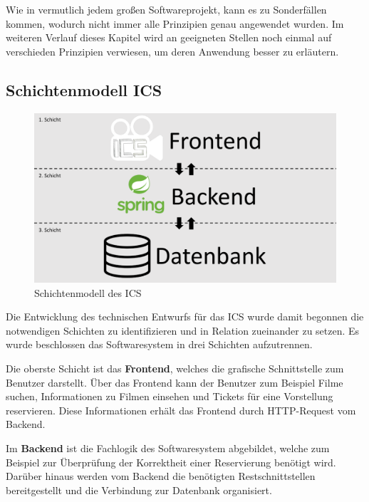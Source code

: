 		Wie in vermutlich jedem großen Softwareprojekt, kann es zu Sonderfällen kommen, wodurch nicht immer alle Prinzipien genau angewendet wurden. Im weiteren Verlauf dieses Kapitel wird an geeigneten Stellen noch einmal auf verschieden Prinzipien verwiesen, um deren Anwendung besser zu erläutern.
		
		\subsection{Schichtenmodell ICS} \label{schichtenmodell}
		
		
		\begin{figure}[H]
			\centering 
			\includegraphics[width=12cm]{img/Schichtenmodell_ICS.pdf}
			\captionsetup{format=hang}
			\caption[Klassendiagramm]{\label{fig:Schichtenmodell} Schichtenmodell des ICS }
		\end{figure}
		
		Die Entwicklung des technischen Entwurfs für das \ac{ICS} wurde damit begonnen die notwendigen Schichten zu identifizieren und in Relation zueinander zu setzen. Es wurde beschlossen das Softwaresystem in drei Schichten aufzutrennen. 
		
		Die oberste Schicht ist das \glqq \textbf{Frontend}\grqq{}, welches die grafische Schnittstelle zum Benutzer darstellt. Über das Frontend kann der Benutzer zum Beispiel Filme suchen, Informationen zu Filmen einsehen und Tickets für eine Vorstellung reservieren. Diese Informationen erhält das Frontend durch HTTP-Request vom Backend.
		
		Im \glqq \textbf{Backend}\grqq{} ist die Fachlogik des Softwaresystem abgebildet, welche zum Beispiel zur Überprüfung der Korrektheit einer Reservierung benötigt wird. Darüber hinaus werden vom Backend die benötigten Restschnittstellen bereitgestellt und die Verbindung zur Datenbank organisiert. 
		
